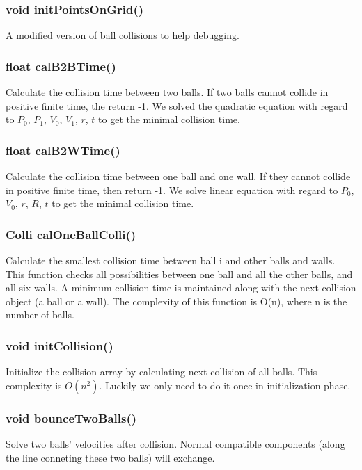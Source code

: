 \documentclass[twoside,11pt]{article}
\begin{document}
\subsubsection{void initPointsOnGrid()}
A modified version of ball collisions to help debugging.

\subsubsection{float calB2BTime()}
Calculate the collision time between two balls. If two balls cannot collide in positive finite time, the return -1. We solved the quadratic equation with regard to $P_0$, $P_1$, $V_0$, $V_1$, $r$, $t$ to get the minimal collision time.

\subsubsection{float calB2WTime()}
Calculate the collision time between one ball and one wall. If they cannot collide in positive finite time, then return -1. We solve linear equation with regard to $P_0$, $V_0$, $r$, $R$, $t$ to get the minimal collision time.

\subsubsection{Colli calOneBallColli()}
Calculate the smallest collision time between ball i and other balls and walls. This function checks all possibilities between one ball and all the other balls, and all six walls. A minimum collision time is maintained along with the next collision object (a ball or a wall). The complexity of this function is O(n), where n is the number of balls.

\subsubsection{void initCollision()}
Initialize the collision array by calculating next collision of all balls. This complexity is $O(n^2)$. Luckily we only need to do it once in initialization phase. 

\subsubsection{void bounceTwoBalls()}
Solve two balls' velocities after collision. Normal compatible components (along the line conneting these two balls) will exchange. 
\end{document}

